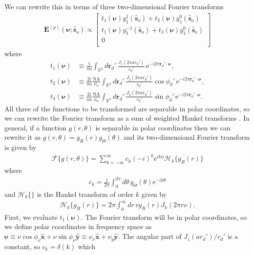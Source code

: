 \documentclass[11pt]{article}
\newcommand{\me}{\mathrm{e}}
\providecommand{\mb}[1]{\mathbf{#1}}
\providecommand{\so}[1]{\mathbf{\hat{s}}_o}
\providecommand{\rd}[1]{\mathbf{r}_d}
\providecommand{\mh}[1]{\mathbf{\hat{#1}}}
\providecommand{\bs}[1]{\boldsymbol{#1}}
\begin{document}
We can rewrite this in terms of three two-dimensional Fourier transforms
\begin{align}
  \mb{E}^{(p)}(\bs{\nu}; \so{}) \propto 
\begin{bmatrix}
    t_1(\bs{\nu})y_1^1(\so{}) + t_2(\bs{\nu})y_1^0(\so{})\\
    t_1(\bs{\nu})y_1^{-1}(\so{}) + t_3(\bs{\nu})y_1^0(\so{})\\
    0\\
  \end{bmatrix}\label{eq:tint}
\end{align}
where
\begin{align}
  t_1(\bs{\nu}) &\equiv \frac{1}{\pi a}\int_{\mathbb{R}^2}d\rd{}'\,  \frac{J_1(2\pi ar_d')}{r_d'}\, \me^{-i 2\pi\rd{}'\cdot\bs{\nu}},\\
  t_2(\bs{\nu}) &\equiv \frac{2i}{\pi a}\frac{\text{NA}}{n_o}\int_{\mathbb{R}^2}d\rd{}'\, \frac{J_2(2\pi ar_d')}{r_d'}\cos\phi_d'\, \me^{-i 2\pi\rd{}'\cdot\bs{\nu}},\\
  t_3(\bs{\nu}) &\equiv \frac{2i}{\pi a}\frac{\text{NA}}{n_o}\int_{\mathbb{R}^2}d\rd{}'\, \frac{J_2(2\pi ar_d')}{r_d'}\sin\phi_d'\, \me^{-i 2\pi\rd{}'\cdot\bs{\nu}}.
\end{align}
All three of the functions to be transformed are separable in polar coordinates,
so we can rewrite the Fourier transform as a sum of weighted Hankel transforms
\cite{goodman1996}. In general, if a function $g(r, \theta)$ is separable in
polar coordinates then we can rewrite it as
$g(r, \theta) = g_{R}(r)g_{\Theta}(\theta)$ and its two-dimensional Fourier transform
is given by
\begin{align}
  \mathcal{F}\{g(r, \theta)\} = \sum_{k=-\infty}^{\infty}c_k(-i)^k\me^{ik\phi}\mathcal{H}_k\{g_R(r)\}
\end{align}
where
\begin{align}
  c_k = \frac{1}{2\pi}\int_0^{2\pi}d\theta\, g_{\Theta}(\theta)\me^{-ik\theta}
\end{align}
and $\mathcal{H}_k\{\}$ is the Hankel transform of order $k$ given by
\begin{align}
  \mathcal{H}_k\{g_R(r)\} = 2\pi\int_0^{\infty}dr\, r g_R(r)J_k(2\pi r \nu).
\end{align}
First, we evaluate $t_1(\bs{\nu})$. The Fourier transform will be in polar
coordinates, so we define polar coordinates in frequency space as
$\bs{\nu} \equiv \nu\cos\phi_\nu\mh{x} + \nu\sin\phi_\nu\mh{y} \equiv \nu_x\mh{x} + \nu_y\mh{y}$. The
angular part of $J_z(ar_d')/r_d'$ is a constant, so $c_k = \delta(k)$ which
\end{document}
